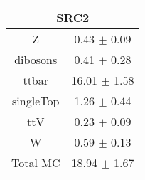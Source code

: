 \begin{tabular}{c|c}
\hline\hline
\multicolumn{2}{c}{\bf SRC2 } \\ \hline 
Z & 0.43 $\pm$ 0.09 \\
dibosons & 0.41 $\pm$ 0.28 \\
ttbar & 16.01 $\pm$ 1.58 \\
singleTop & 1.26 $\pm$ 0.44 \\
ttV & 0.23 $\pm$ 0.09 \\
W & 0.59 $\pm$ 0.13 \\
\hline
Total MC & 18.94 $\pm$ 1.67 \\
\hline\hline
\end{tabular}
